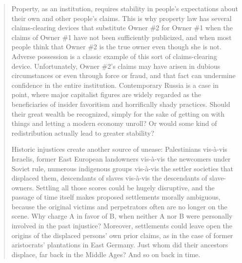 \begin{quotation}
Property, as an institution, requires stability in people's expectations about
their own and other people's claims. This is why property law has several
claims-clearing devices that substitute Owner \#2 for Owner \#1 when the claims
of Owner \#1 have not been sufficiently publicized, and when most people think
that Owner \#2 is the true owner even though she is not. Adverse possession is a
classic example of this sort of claims-clearing
device. Unfortunately, Owner \#2's claims
may have arisen in dubious circumstances or even through force or fraud, and
that fact can undermine confidence in the entire institution. Contemporary
Russia is a case in point, where major capitalist figures are widely regarded as
the beneficiaries of insider favoritism and horrifically shady practices. Should
their great wealth be recognized, simply for the sake of getting on with things
and letting a modern economy unroll? Or would some kind of redistribution
actually lead to greater stability? 

Historic injustices create another source of unease: Palestinians vis-\`a-vis
Israelis, former East European landowners vis-\`a-vis the newcomers under Soviet
rule, numerous indigenous groups vis-\`a-vis the settler societies that
displaced them, descendants of slaves vis-\`a-vis the descendants of
slave-owners. Settling all those scores could be hugely disruptive, and the
passage of time itself makes proposed settlements morally ambiguous, because the
original victims and perpetrators often are no longer on the scene. Why charge A
in favor of B, when neither A nor B were personally involved in the past
injustice? Moreover, settlements could leave open the origins of the displaced
persons' own prior claims, as in the case of former aristocrats' plantations in
East Germany. Just whom did their ancestors displace, far back in the Middle
Ages? And so on back in time. 


\end{quotation}

